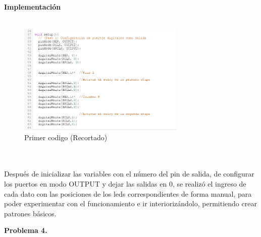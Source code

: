 \documentclass{article}
\begin{document}
\textbf{\large Implementación}\\\\
\begin{figure}[h]
    \includegraphics[width=8cm]{Imagen3.png}
    \centering
    \caption{Primer codigo (Recortado)}
    \label{fig:Imagen3}
\end{figure}\\\\

Después de inicializar las variables con el número del pin de salida, de configurar los puertos en modo OUTPUT y dejar las salidas en 0, se realizó el ingreso de cada dato con las posiciones de los leds correspondientes de forma manual, para poder experimentar con el funcionamiento e ir interiorizándolo, permitiendo crear patrones básicos.

\textbf{\large Problema 4.}\\\\
\end{document}
